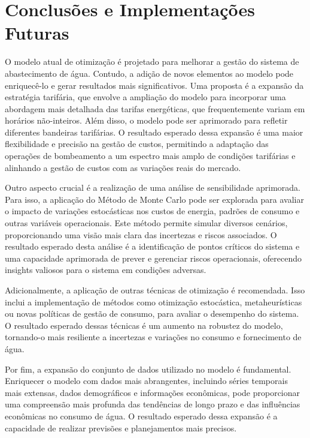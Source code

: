 \chapter{Conclusões e Implementações Futuras}
\label{chap:conclusoes}

O modelo atual de otimização é projetado para melhorar a gestão do sistema de abastecimento de água. Contudo, a adição de novos elementos ao modelo pode enriquecê-lo e gerar resultados mais significativos. Uma proposta é a expansão da estratégia tarifária, que envolve a ampliação do modelo para incorporar uma abordagem mais detalhada das tarifas energéticas, que frequentemente variam em horários não-inteiros. Além disso, o modelo pode ser aprimorado para refletir diferentes bandeiras tarifárias. O resultado esperado dessa expansão é uma maior flexibilidade e precisão na gestão de custos, permitindo a adaptação das operações de bombeamento a um espectro mais amplo de condições tarifárias e alinhando a gestão de custos com as variações reais do mercado.

Outro aspecto crucial é a realização de uma análise de sensibilidade aprimorada. Para isso, a aplicação do Método de Monte Carlo pode ser explorada para avaliar o impacto de variações estocásticas nos custos de energia, padrões de consumo e outras variáveis operacionais. Este método permite simular diversos cenários, proporcionando uma visão mais clara das incertezas e riscos associados. O resultado esperado desta análise é a identificação de pontos críticos do sistema e uma capacidade aprimorada de prever e gerenciar riscos operacionais, oferecendo insights valiosos para o sistema em condições adversas.

Adicionalmente, a aplicação de outras técnicas de otimização é recomendada. Isso inclui a implementação de métodos como otimização estocástica, metaheurísticas ou novas políticas de gestão de consumo, para avaliar o desempenho do sistema. O resultado esperado dessas técnicas é um aumento na robustez do modelo, tornando-o mais resiliente a incertezas e variações no consumo e fornecimento de água.

Por fim, a expansão do conjunto de dados utilizado no modelo é fundamental. Enriquecer o modelo com dados mais abrangentes, incluindo séries temporais mais extensas, dados demográficos e informações econômicas, pode proporcionar uma compreensão mais profunda das tendências de longo prazo e das influências econômicas no consumo de água. O resultado esperado dessa expansão é a capacidade de realizar previsões e planejamentos mais precisos.